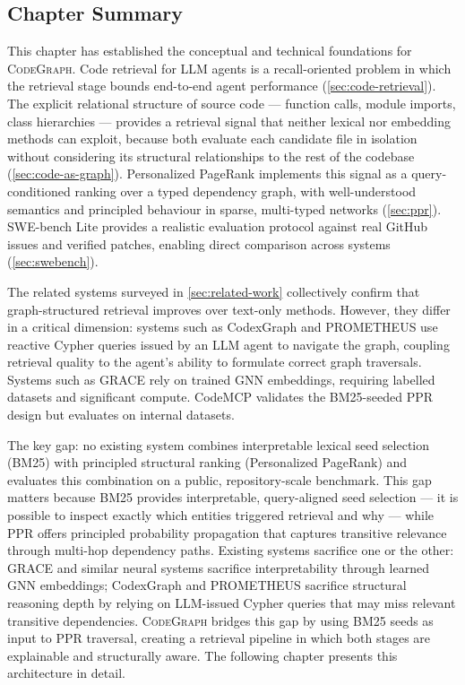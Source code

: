 \subsection{Chapter Summary}
\label{sec:background-summary}

This chapter has established the conceptual and technical foundations for
\textsc{CodeGraph}.
Code retrieval for LLM agents is a recall-oriented problem in which the retrieval stage
bounds end-to-end agent performance (\cref{sec:code-retrieval}).
The explicit relational structure of source code — function calls, module imports, class
hierarchies — provides a retrieval signal that neither lexical nor embedding methods can
exploit, because both evaluate each candidate file in isolation without considering its
structural relationships to the rest of the codebase (\cref{sec:code-as-graph}).
Personalized PageRank implements this signal as a query-conditioned ranking over
a typed dependency graph, with well-understood semantics and principled behaviour in
sparse, multi-typed networks (\cref{sec:ppr}).
SWE-bench Lite provides a realistic evaluation protocol against real GitHub issues and
verified patches, enabling direct comparison across systems (\cref{sec:swebench}).

The related systems surveyed in \cref{sec:related-work} collectively confirm that
graph-structured retrieval improves over text-only methods.
However, they differ in a critical dimension: systems such as CodexGraph and PROMETHEUS
use reactive Cypher queries issued by an LLM agent to navigate the graph, coupling
retrieval quality to the agent's ability to formulate correct graph traversals.
Systems such as GRACE rely on trained GNN embeddings, requiring labelled datasets and
significant compute.
CodeMCP validates the BM25-seeded PPR design but evaluates on internal datasets.

The key gap: no existing system combines interpretable lexical seed selection (BM25)
with principled structural ranking (Personalized PageRank) and evaluates this combination
on a public, repository-scale benchmark.
This gap matters because BM25 provides interpretable, query-aligned seed selection —
it is possible to inspect exactly which entities triggered retrieval and why — while PPR
offers principled probability propagation that captures transitive relevance through
multi-hop dependency paths.
Existing systems sacrifice one or the other: GRACE and similar neural systems sacrifice
interpretability through learned GNN embeddings; CodexGraph and PROMETHEUS sacrifice
structural reasoning depth by relying on LLM-issued Cypher queries that may miss
relevant transitive dependencies.
\textsc{CodeGraph} bridges this gap by using BM25 seeds as input to PPR traversal,
creating a retrieval pipeline in which both stages are explainable and structurally aware.
The following chapter presents this architecture in detail.